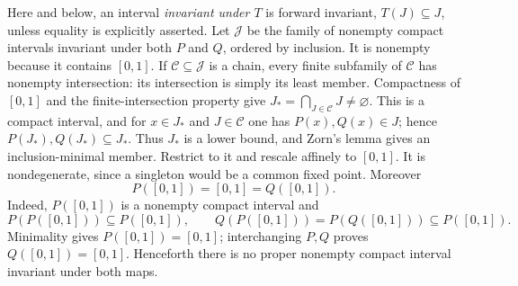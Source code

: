 \documentclass[11pt]{article}
\theoremstyle{definition}
\theoremstyle{remark}
\newcommand{\I}{[0,1]}
\begin{document}
Here and below, an interval \emph{invariant under \(T\)} is forward
invariant, \(T(J)\subseteq J\), unless equality is explicitly asserted.  Let
$\mathscr J$ be the family of nonempty compact intervals invariant under
both $P$ and $Q$, ordered by inclusion.  It is nonempty because it contains
$\I$.  If $\mathscr C\subseteq\mathscr J$ is a chain, every finite subfamily
of $\mathscr C$ has nonempty intersection: its intersection is simply its
least member.  Compactness of $\I$ and the finite-intersection property give
\(J_*=\bigcap_{J\in\mathscr C}J\neq\varnothing\).  This is a compact
interval, and for $x\in J_*$ and $J\in\mathscr C$ one has
$P(x),Q(x)\in J$; hence $P(J_*),Q(J_*)\subseteq J_*$.  Thus $J_*$ is a lower
bound, and Zorn's lemma gives an inclusion-minimal member.  Restrict to it
and rescale affinely to $\I$.  It is nondegenerate, since a singleton would
be a common fixed point.  Moreover
\begin{equation}\label{eq:onto}
 P(\I)=\I=Q(\I).
\end{equation}
Indeed, $P(\I)$ is a nonempty compact interval and
\[
 P(P(\I))\subseteq P(\I),\qquad
 Q(P(\I))=P(Q(\I))\subseteq P(\I).
\]
Minimality gives $P(\I)=\I$; interchanging $P,Q$ proves $Q(\I)=\I$.
Henceforth there is no proper nonempty compact interval invariant under both
maps.
\end{document}
